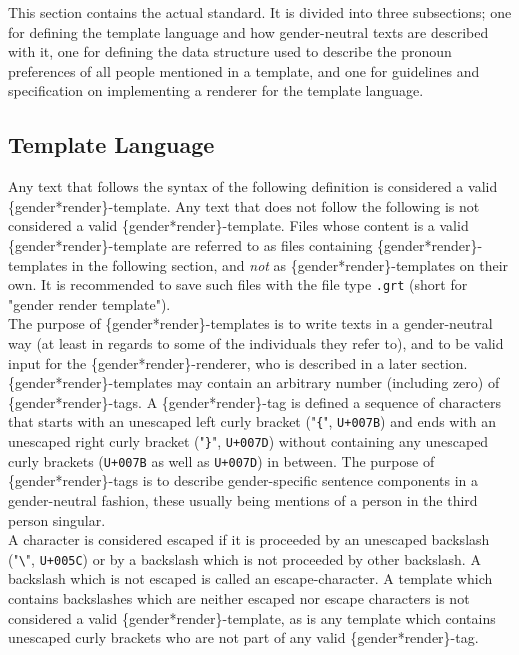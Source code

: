 \documentclass{article}
\begin{document}
    This section contains the actual standard.
    It is divided into three subsections;
    one for defining the template language and how gender-neutral texts are described with it,
    one for defining the data structure used to describe the pronoun preferences of all people mentioned in a template,
    and one for guidelines and specification on implementing a renderer for the template language.

    \subsection{Template Language}

    Any text that follows the syntax of the following definition is considered a valid \{gender*render\}-template.
    Any text that does not follow the following is not considered a valid \{gender*render\}-template.
    Files whose content is a valid \{gender*render\}-template are referred to as files containing \{gender*render\}-templates in the following section, and \emph{not} as \{gender*render\}-templates on their own.
    It is recommended to save such files with the file type \texttt{.grt} (short for "gender render template").\\

    The purpose of \{gender*render\}-templates is to write texts in a gender-neutral way (at least in regards to some of the individuals they refer to), and to be valid input for the \{gender*render\}-renderer, who is described in a later section.\\

    \{gender*render\}-templates may contain an arbitrary number (including zero) of \{gender*render\}-tags.
    A \{gender*render\}-tag is defined a sequence of characters that starts with an unescaped left curly bracket ("\texttt{\{}", \texttt{U+007B}) and ends with an unescaped right curly bracket ("\texttt{\}}", \texttt{U+007D}) without containing any unescaped curly brackets (\texttt{U+007B} as well as \texttt{U+007D}) in between.
    The purpose of \{gender*render\}-tags is to describe gender-specific sentence components in a gender-neutral fashion, these usually being mentions of a person in the third person singular.\\

    A character is considered escaped if it is proceeded by an unescaped backslash ("\texttt{\textbackslash}", \texttt{U+005C}) or by a backslash which is not proceeded by other backslash.
    A backslash which is not escaped is called an escape-character.
    A template which contains backslashes which are neither escaped nor escape characters is not considered a valid \{gender*render\}-template, as is any template which contains unescaped curly brackets who are not part of any valid \{gender*render\}-tag.\\
\end{document}
